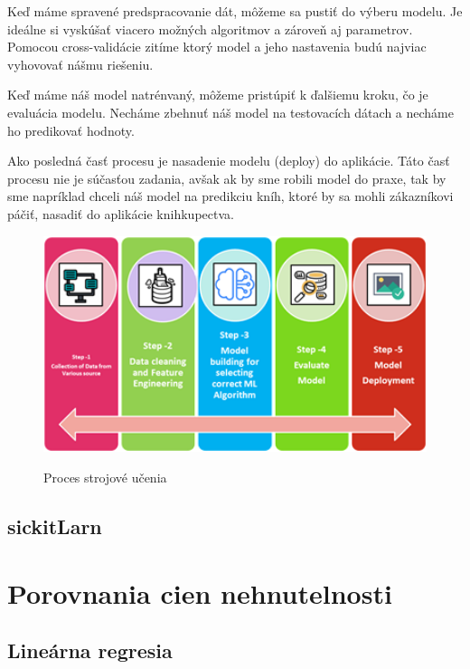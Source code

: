 Keď máme spravené predspracovanie dát, môžeme sa pustiť do výberu modelu. Je ideálne si vyskúšať viacero možných algoritmov a zároveň aj parametrov. Pomocou cross-validácie zitíme ktorý model a jeho nastavenia budú najviac vyhovovať nášmu riešeniu. 

Keď máme náš model natrénvaný, môžeme pristúpiť k ďalšiemu kroku, čo je evaluácia modelu. Necháme zbehnuť náš model na testovacích dátach a necháme ho predikovať hodnoty. 

Ako posledná časť procesu je nasadenie modelu (deploy) do aplikácie. Táto časť procesu nie je súčasťou zadania, avšak ak by sme robili model do praxe, tak by sme napríklad chceli náš model na predikciu kníh, ktoré by sa mohli zákazníkovi páčiť, nasadiť do aplikácie knihkupectva.

\begin{figure}[!ht]
  \centering
  \includegraphics[width=1\textwidth]{figures/process.png}
  \caption{Proces strojové učenia}
  \cite{process}
\end{figure}

\subsection{sickitLarn}


\section{Porovnania cien nehnutelnosti}

\subsection{Lineárna regresia}
